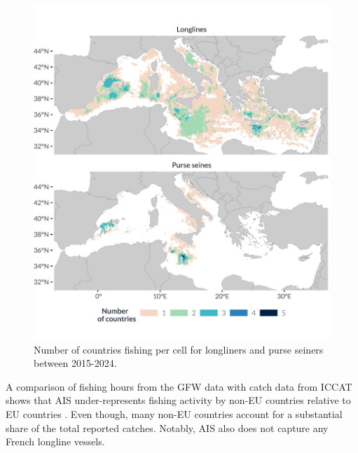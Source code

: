 \begin{figure}[H]
    \centering
    \includegraphics[width=1\linewidth, trim=0 1.2cm 0 1.2cm,clip]{Figures/plots/no_countries.pdf}
    \caption{Number of countries fishing per cell for longliners and purse seiners between 2015-2024.}
    \label{fig:no_countries}
\end{figure}

A comparison of fishing hours from the GFW data with catch data from ICCAT shows that AIS under-represents fishing activity by non-EU countries relative to EU countries
. Even though, many non-EU countries account for a substantial share of the total reported catches. Notably, AIS also does not capture any French
longline vessels.


